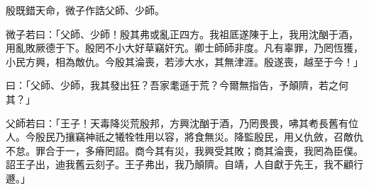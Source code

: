 
\begin{pinyinscope}
殷既錯天命，微子作誥父師、少師。

微子若曰：「父師、少師！殷其弗或亂正四方。我祖厎遂陳于上，我用沈酗于酒，用亂敗厥德于下。殷罔不小大好草竊奸宄。卿士師師非度。凡有辜罪，乃罔恆獲，小民方興，相為敵仇。今殷其淪喪，若涉大水，其無津涯。殷遂喪，越至于今！」

曰：「父師、少師，我其發出狂？吾家耄遜于荒？今爾無指告，予顛隮，若之何其？」

父師若曰：「王子！天毒降災荒殷邦，方興沈酗于酒，乃罔畏畏，咈其耇長舊有位人。今殷民乃攘竊神祇之犧牷牲用以容，將食無災。降監殷民，用乂仇斂，召敵仇不怠。罪合于一，多瘠罔詔。商今其有災，我興受其敗；商其淪喪，我罔為臣僕。詔王子出，迪我舊云刻子。王子弗出，我乃顛隮。自靖，人自獻于先王，我不顧行遯。」


\end{pinyinscope}